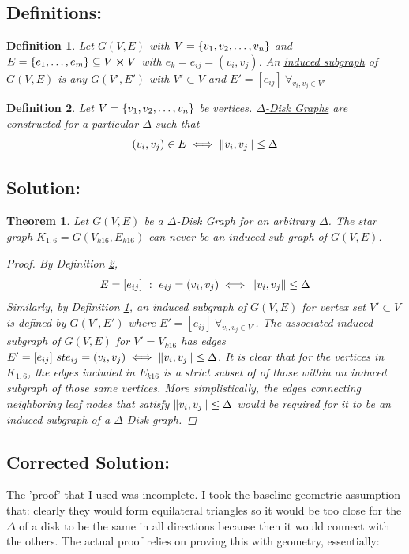 \documentclass[]{article}
\numberwithin{equation}{section}
\newcommand{\st}{\ : \ }
\newtheorem{definition}{Definition}
\newtheorem{theorem}{Theorem}
\begin{document}
\subsection{Definitions:}
\begin{definition}\label{def:induced_subgraph}
	Let $G(V,E)$ with $V = \qty{v_1,v_2,\dots,v_n}$ 
	and $E = \qty{e_1, \dots, e_m} \subseteq V \cross V$ 
	with $e_k = e_{ij} = (v_i, v_j)$.
	An \emph{\underline{induced subgraph}} of $G(V,E)$ is any $G(V',E')$ with $V'\subset V$ and $E' = [e_{ij}] \ \forall_{v_i, v_j \in V'}$
\end{definition}

\begin{definition}\label{def:Delta-disk_graph}
	Let $V = \qty{v_1,v_2,\dots,v_n}$ be vertices.
	\emph{\underline{$\Delta$-Disk Graphs}} are constructed for a particular $\Delta$ such that \[
		(v_i,v_j) \in E \iff \norm{v_i,v_j} \leq \Delta
	\]
\end{definition}

\subsection{Solution:}
\begin{theorem}
	Let $G(V,E)$ be a $\Delta$-Disk Graph for an arbitrary $\Delta$.
	The star graph $K_{1,6} = G(V_{k16},E_{k16})$ can never be an induced sub graph of $G(V,E)$.
	\begin{proof}
		By Definition \ref{def:Delta-disk_graph}, \[
			E = [e_{ij}] \st e_{ij} = (v_i,v_j) \iff \norm{v_i,v_j} \leq \Delta
		\] Similarly, by Definition \ref{def:induced_subgraph}, an induced subgraph of $G(V,E)$ for vertex set $V' \subset V$ is defined by $G(V',E')$ where $E' = [e_{ij}] \ \forall_{v_i, v_j \in V'}$.
		The associated induced subgraph of $G(V,E)$ for $V' = V_{k16}$ has edges $E' = [e_{ij}] \ st e_{ij} = (v_i,v_j) \iff \norm{v_i,v_j} \leq \Delta$.
		It is clear that for the vertices in $K_{1,6}$, the edges included in $E_{k16}$ is a strict subset of of those within an induced subgraph of those same vertices.
		More simplistically, the edges connecting neighboring leaf nodes that satisfy $\norm{v_i,v_j} \leq \Delta$ would be required for it to be an induced subgraph of a $\Delta$-Disk graph.
	\end{proof}
\end{theorem}

\subsection*{\color{red} Corrected Solution:}
The 'proof' that I used was incomplete. 
I took the baseline geometric assumption that: clearly they would form equilateral triangles so it would be too close for the $\Delta$ of a disk to be the same in all directions because then it would connect with the others.
The actual proof relies on proving this with geometry, essentially:
\end{document}
